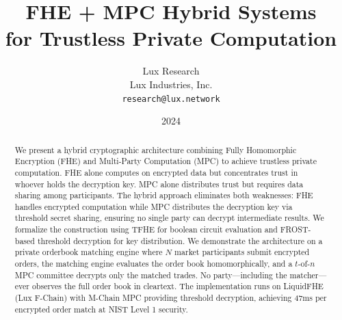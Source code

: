 \documentclass[11pt,a4paper]{article}
\title{FHE + MPC Hybrid Systems\\for Trustless Private Computation}
\author{
Lux Research \\
Lux Industries, Inc.\\
\texttt{research@lux.network}
}
\date{2024}
\begin{document}
\luxcoverpage

\begin{abstract}
We present a hybrid cryptographic architecture combining Fully Homomorphic Encryption (FHE) and Multi-Party Computation (MPC) to achieve trustless private computation. FHE alone computes on encrypted data but concentrates trust in whoever holds the decryption key. MPC alone distributes trust but requires data sharing among participants. The hybrid approach eliminates both weaknesses: FHE handles encrypted computation while MPC distributes the decryption key via threshold secret sharing, ensuring no single party can decrypt intermediate results. We formalize the construction using TFHE for boolean circuit evaluation and FROST-based threshold decryption for key distribution. We demonstrate the architecture on a private orderbook matching engine where $N$ market participants submit encrypted orders, the matching engine evaluates the order book homomorphically, and a $t$-of-$n$ MPC committee decrypts only the matched trades. No party---including the matcher---ever observes the full order book in cleartext. The implementation runs on LiquidFHE (Lux F-Chain) with M-Chain MPC providing threshold decryption, achieving 47ms per encrypted order match at NIST Level 1 security.
\end{abstract}











\end{document}
